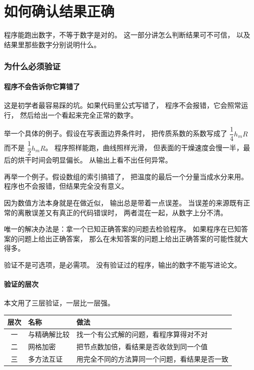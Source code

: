 \part{如何确认结果正确}

程序能跑出数字，不等于数字是对的。
这一部分讲怎么判断结果可不可信，
以及结果里那些数字分别说明什么。

\section{为什么必须验证}

\subsection{程序不会告诉你它算错了}

这是初学者最容易踩的坑。如果代码里公式写错了，
程序不会报错，它会照常运行，
然后给出一个看起来完全正常的数字。

举一个具体的例子。假设在写表面边界条件时，
把传质系数的系数写成了 $\dfrac{1}{4}h_mR$ 而不是 $\dfrac{1}{2}h_mR$。
程序照样能跑，曲线照样光滑，
但表面的干燥速度会慢一半，最后的烘干时间会明显偏长。
从输出上看不出任何异常。

再举一个例子。假设数组的索引搞错了，
把温度的最后一个分量当成水分来用。
程序也不会报错，但结果完全没有意义。

因为数值方法本身就是在做近似，
输出总是带着一点误差。
当误差的来源既有正常的离散误差又有真正的代码错误时，
两者混在一起，从数字上分不清。

唯一的解决办法是：拿一个已知正确答案的问题去检验程序。
如果程序在已知答案的问题上给出正确答案，
那么在未知答案的问题上给出正确答案的可能性就大得多。

\keypoint
验证不是可选项，是必需项。
没有验证过的程序，输出的数字不能写进论文。

\subsection{验证的层次}

本文用了三层验证，一层比一层强。

\begin{center}
\begin{tabular}{@{}clp{7.6cm}@{}}
\toprule
层次 & 名称 & 做法 \\
\midrule
一 & 与精确解比较 & 找一个有公式解的问题，看程序算得对不对 \\
二 & 网格加密 & 把节点数加倍，看结果是否收敛到同一个值 \\
三 & 多方法互证 & 用完全不同的方法算同一个问题，看结果是否一致 \\
\bottomrule
\end{tabular}
\end{center}

